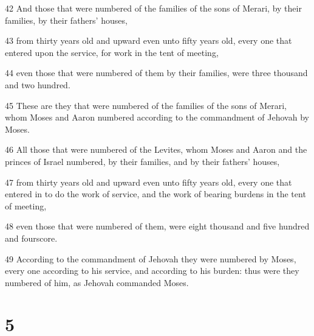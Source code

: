 \par 42 And those that were numbered of the families of the sons of Merari, by their families, by their fathers' houses,
\par 43 from thirty years old and upward even unto fifty years old, every one that entered upon the service, for work in the tent of meeting,
\par 44 even those that were numbered of them by their families, were three thousand and two hundred.
\par 45 These are they that were numbered of the families of the sons of Merari, whom Moses and Aaron numbered according to the commandment of Jehovah by Moses.
\par 46 All those that were numbered of the Levites, whom Moses and Aaron and the princes of Israel numbered, by their families, and by their fathers' houses,
\par 47 from thirty years old and upward even unto fifty years old, every one that entered in to do the work of service, and the work of bearing burdens in the tent of meeting,
\par 48 even those that were numbered of them, were eight thousand and five hundred and fourscore.
\par 49 According to the commandment of Jehovah they were numbered by Moses, every one according to his service, and according to his burden: thus were they numbered of him, as Jehovah commanded Moses.

\chapter{5}

